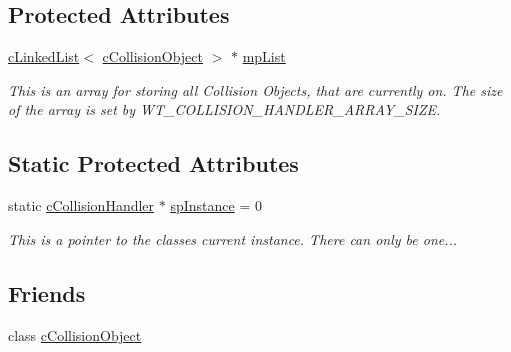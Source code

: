 \subsection*{Protected Attributes}
\begin{DoxyCompactItemize}
\item 
\hyperlink{classc_linked_list}{cLinkedList}$<$ \hyperlink{classc_collision_object}{cCollisionObject} $>$ $\ast$ \hyperlink{classc_collision_handler_a959870d5beee77a014b29e45bf153723}{mpList}
\begin{DoxyCompactList}\small\item\em This is an array for storing all Collision Objects, that are currently on. The size of the array is set by WT\_\-COLLISION\_\-HANDLER\_\-ARRAY\_\-SIZE. \item\end{DoxyCompactList}\end{DoxyCompactItemize}
\subsection*{Static Protected Attributes}
\begin{DoxyCompactItemize}
\item 
static \hyperlink{classc_collision_handler}{cCollisionHandler} $\ast$ \hyperlink{classc_collision_handler_aa1157b48699bb2b8572788a7105554d5}{spInstance} = 0
\begin{DoxyCompactList}\small\item\em This is a pointer to the classes current instance. There can only be one... \item\end{DoxyCompactList}\end{DoxyCompactItemize}
\subsection*{Friends}
\begin{DoxyCompactItemize}
\item 
class \hyperlink{classc_collision_handler_a3fc30c810c62135f498c47205c853e30}{cCollisionObject}
\end{DoxyCompactItemize}


